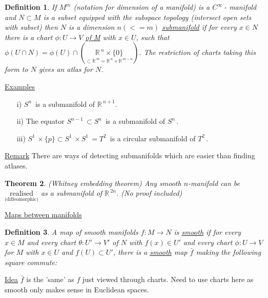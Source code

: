 \documentclass[12pt,a4paper]{article}
\newcommand{\rR}{\ensuremath{\mathbb{R}\,}}
\newcommand{\cinf}{\ensuremath{C^{\infty}\,}}
\newcommand{\sph}[1]{\ensuremath{S^{#1}}\,}
\newcommand{\tor}[1]{\ensuremath{T^{#1}}\,}
\newcommand{\ul}[1]{\underline{#1}}
\newtheorem{thm}{Theorem}[subsubsection]
\newtheorem{defn}[thm]{Definition}
\begin{document}
\begin{defn}
If $M^m$ (notation for dimension of a manifold) is a $\cinf$- manifold and $N\subset M$ is a subset equipped with the subspace topology (intersect open sets with subset) then $N$ is a dimension $n(<=m)$ \ul{submanifold} if for every $x\in N$ there is a chart $\phi:U\to V$ \ul{of M} with $x\in U$, such that $\phi(U\cap N)=\phi(U)\cap \left(\underset{\subset \rR^m=\rR^n \times\rR^{m-n}}{\rR^n\times \{0\}}\right)$. The restriction of charts taking this form to $N$ gives an atlas for $N$.
\end{defn}

\ul{Examples} \begin{itemize}
\item[i)] \sph{n} is a submanifold of $\rR^{n+1}$. 
\item [ii)] The equator $\sph{n-1}\subset \sph{n}$ is a submanifold of $\sph{n}$.
\item[iii)] $\sph{1}\times \{p\}\subset \sph{1}\times\sph{1}=\tor{2}$ is a circular submanifold of \tor{2}.
\end{itemize}

\ul{Remark} There are ways of detecting submanifolds which are easier than finding atlases.
 
\begin{thm}
(Whitney embedding theorem) Any smooth $n$-manifold can be $\underset{\text{(diffeomorphic)}}{\text{realised}}$ as a submanifold of $\rR^{2n}$. (No proof included)
\end{thm} 

\ul{Maps between manifolds}

\begin{defn}
A map of smooth manifolds $f:M\to N$ is \ul{smooth} if for every $x\in M$ and every chart $\theta:U'\to V'$ of $N$ with $f(x)\in U'$ and every chart $\phi:U\to V$ for $M$ with $x\in U$ and $f(U)\subset U'$, there is a \ul{smooth} map $\bar{f}$ making the following square commute:
\end{defn}

\begin{center}
\end{center}

\ul{Idea} $\bar{f}$ is the 'same' as $f$ just viewed through charts. Need to use charts here as smooth only makes sense in Euclidean spaces. 
\end{document}
